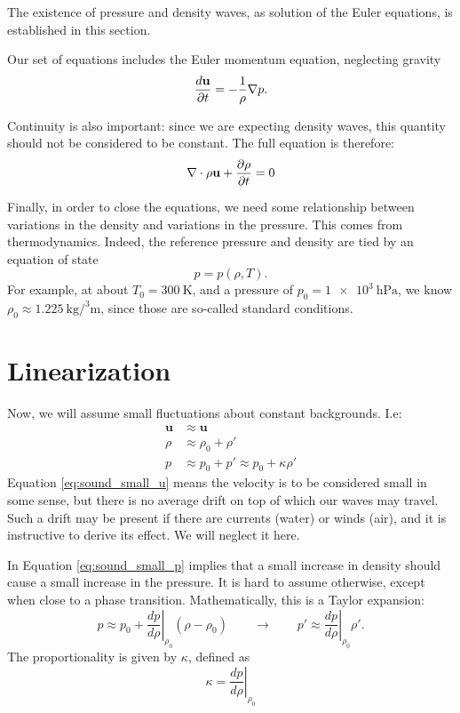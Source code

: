 \label{sec:sound_waves}

The existence of pressure and density waves, as solution of the Euler
equations, is established in this section.

Our set of equations includes the Euler momentum equation, neglecting
gravity
\[
\frac{d \mathbf{u} }{\partial t}= - \frac{1}{\rho} \nabla p  .
\]

Continuity is also important: since we are expecting density waves,
this quantity should not be considered to be constant. The full
equation is therefore:
\[
\nabla \cdot \rho \mathbf{u} + \frac{\partial \rho}{\partial t} =0
\]

Finally, in order to close the equations, we need some relationship
between variations in the density and variations in the pressure. This
comes from thermodynamics. Indeed, the reference pressure and density
are tied by an equation of state
\[
p=p(\rho,T) .\] For example, at about $T_0=\SI{300}{\kelvin}$, and a
pressure of $p_0=\SI{1e3}{\hecto\pascal}$, we know
$\rho_0\approx\SI{1.225}{\kilo\gram\per\cubed\meter}$, since those are
so-called standard conditions.

\section{Linearization}

Now, we will assume small fluctuations about constant backgrounds. I.e:
\begin{align}
  \label{eq:sound_small_u}
  \mathbf{u} & \approx \mathbf{u} \\
  \label{eq:sound_small_rho}
  \rho       & \approx \rho_0 + \rho' \\
  \label{eq:sound_small_p}
  p          & \approx p_0+ p' \approx p_0+ \kappa \rho'
\end{align}
Equation \ref{eq:sound_small_u} means the velocity is to be considered
small in some sense, but there is no average drift on top of which our
waves may travel. Such a drift may be present if there are currents
(water) or winds (air), and it is instructive to derive its effect. We
will neglect it here.

In Equation \ref{eq:sound_small_p} implies that a small increase in
density should cause a small increase in the pressure. It is hard to
assume otherwise, except when close to a phase
transition. Mathematically, this is a Taylor expansion:
\[
p \approx
p_0 +
\left. \frac{d p}{d\rho} \right|_{\rho_0} (\rho-\rho_0)
\qquad\to\qquad
p' \approx \left. \frac{d p}{d\rho} \right|_{\rho_0} \rho' .
\]
The proportionality is given by $\kappa$, defined as
\begin{equation}
  \label{eq:sound_kappa}
  \kappa =  \left. \frac{d p}{d\rho} \right|_{\rho_0} 
\end{equation}


